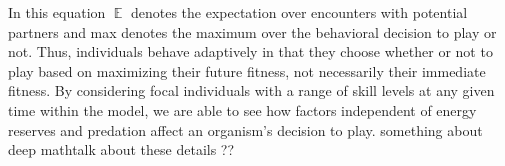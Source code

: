 \documentclass[12pt, letterpaper, fleqn]{article}
\DeclareMathOperator{\E}{\mathbb{E}}
\begin{document}
	
	In this equation $\E$ denotes the expectation over encounters with potential partners and max denotes the maximum over the behavioral decision to play or not.      
	Thus, individuals behave adaptively in that they choose whether or not to play based on maximizing their future fitness, not necessarily their immediate fitness.
	By considering focal individuals with a range of skill levels at any given time within the model, we are able to see how factors independent of energy reserves and predation affect an organism's decision to play.
	{\color{red}something about deep mathtalk about these details ??}
	\\   
    
	
	
	
\end{document}
